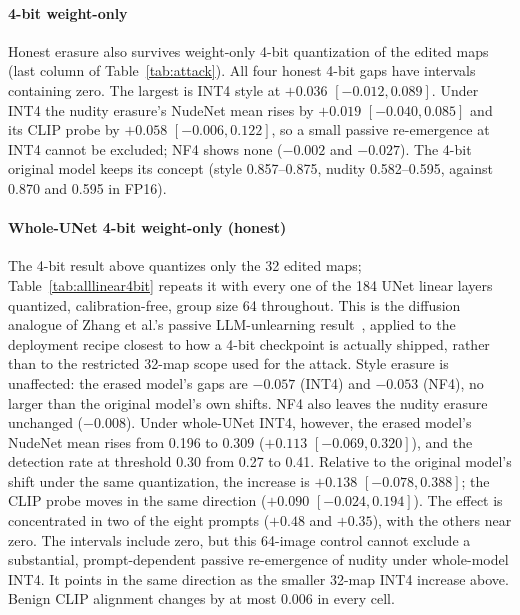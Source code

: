 \documentclass[conference]{IEEEtran}
\begin{document}
\paragraph{4-bit weight-only}
Honest erasure also survives weight-only 4-bit quantization of the edited maps
(last column of Table~\ref{tab:attack}). All four honest 4-bit gaps have intervals
containing zero. The largest is INT4 style at $+0.036$ $[-0.012,0.089]$. Under INT4
the nudity erasure's NudeNet mean rises by $+0.019$ $[-0.040,0.085]$ and its CLIP
probe by $+0.058$ $[-0.006,0.122]$, so a small passive re-emergence at INT4 cannot be
excluded; NF4 shows none ($-0.002$ and $-0.027$). The 4-bit original model keeps its
concept (style 0.857--0.875, nudity 0.582--0.595, against 0.870 and 0.595 in FP16).

\paragraph{Whole-UNet 4-bit weight-only (honest)}
The 4-bit result above quantizes only the 32 edited maps; Table~\ref{tab:alllinear4bit}
repeats it with every one of the 184 UNet linear layers quantized, calibration-free,
group size 64 throughout. This is the diffusion analogue of Zhang et al.'s passive
LLM-unlearning result~\cite{zhang2025}, applied to the deployment recipe closest to how
a 4-bit checkpoint is actually shipped, rather than to the restricted 32-map scope used
for the attack. Style erasure is unaffected: the erased model's gaps are $-0.057$ (INT4)
and $-0.053$ (NF4), no larger than the original model's own shifts. NF4 also leaves
the nudity erasure unchanged ($-0.008$). Under whole-UNet INT4, however, the erased
model's NudeNet mean rises from 0.196 to 0.309 ($+0.113$ $[-0.069,0.320]$), and the
detection rate at threshold 0.30 from 0.27 to 0.41. Relative to the original model's
shift under the same quantization, the increase is $+0.138$ $[-0.078,0.388]$; the CLIP
probe moves in the same direction ($+0.090$ $[-0.024,0.194]$). The effect is
concentrated in two of the eight prompts ($+0.48$ and $+0.35$), with the others near
zero. The intervals include zero, but this 64-image control cannot exclude a
substantial, prompt-dependent passive re-emergence of nudity under whole-model INT4.
It points in the same direction as the smaller 32-map INT4 increase above.
Benign CLIP alignment changes by at most 0.006 in every cell.
\end{document}
